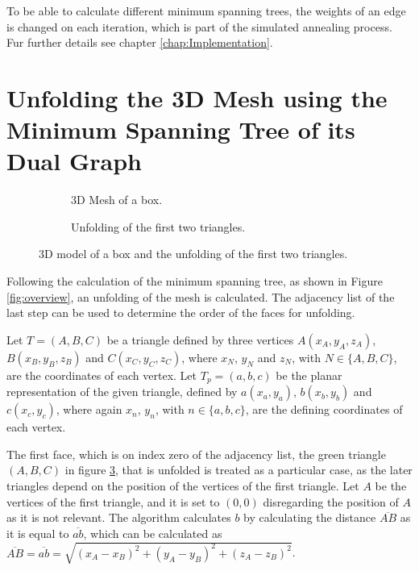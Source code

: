 \documentclass[draft,final]{vutinfth} %
\begin{document}
To be able to calculate different minimum spanning trees, the weights of an edge is changed on each iteration, which is part of the simulated annealing process. Fur further details see chapter \ref{chap:Implementation}.

\section{Unfolding the 3D Mesh using the Minimum Spanning Tree of its Dual Graph}
\label{sec:unfold}

\begin{figure}
\centering
\begin{subfigure}[t]{.4\textwidth}
	
  \caption{3D Mesh of a box.}
	\label{fig:unfold3d}
\end{subfigure}%
\hspace{.1\textwidth}
\begin{subfigure}[t]{.4\textwidth}
	
	\caption{Unfolding of the first two triangles.}
	\label{fig:unfold2d}
\end{subfigure}
\caption{3D model of a box and the unfolding of the first two triangles.}
\label{fig:unfoldexample}
\end{figure}

Following the calculation of the minimum spanning tree, as shown in Figure \ref{fig:overview}, an unfolding of the mesh is calculated. The adjacency list of the last step can be used to determine the order of the faces for unfolding.

Let $T = (A,B,C)$ be a triangle defined by three vertices $A(x_A, y_A, z_A)$, $B(x_B, y_B, z_B)$ and $C(x_C, y_C, z_C)$, where $x_N$, $y_N$ and $z_N$, with $N \in \{A,B,C\}$, are the coordinates of each vertex. Let $T_p = (a, b, c)$ be the planar representation of the given triangle, defined by $a(x_a, y_a)$, $b(x_b, y_b)$ and $c(x_c, y_c)$, where again $x_n$, $y_n$, with $n \in \{a,b,c\}$, are the defining coordinates of each vertex.

The first face, which is on index zero of the adjacency list, the green triangle $(A,B,C)$ in figure \ref{fig:unfoldexample}, that is unfolded is treated as a particular case, as the later triangles depend on the position of the vertices of the first triangle. Let $A$ be the vertices of the first triangle, and it is set to $(0,0)$ disregarding the position of $A$ as it is not relevant. The algorithm calculates $b$ by calculating the distance $\overline{AB}$ as it is equal to $\overline{ab}$, which can be calculated as $\overline{AB} = \overline{ab} = \sqrt{(x_A - x_B)^2 + (y_A - y_B)^2 + (z_A - z_B)^2}$.
\end{document}
